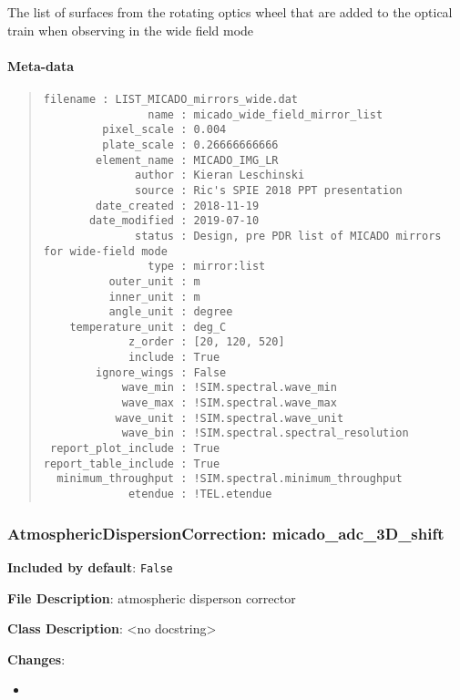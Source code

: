 The list of surfaces from the rotating optics wheel that are added to the optical train when observing in the wide field mode


\paragraph{Meta-data%
  \label{meta-data}%
}

\begin{quote}
\begin{alltt}
\begin{lstlisting}[frame=single]
            filename : LIST_MICADO_mirrors_wide.dat
                name : micado_wide_field_mirror_list
         pixel_scale : 0.004
         plate_scale : 0.26666666666
        element_name : MICADO_IMG_LR
              author : Kieran Leschinski
              source : Ric's SPIE 2018 PPT presentation
        date_created : 2018-11-19
       date_modified : 2019-07-10
              status : Design, pre PDR list of MICADO mirrors for wide-field mode
                type : mirror:list
          outer_unit : m
          inner_unit : m
          angle_unit : degree
    temperature_unit : deg_C
             z_order : [20, 120, 520]
             include : True
        ignore_wings : False
            wave_min : !SIM.spectral.wave_min
            wave_max : !SIM.spectral.wave_max
           wave_unit : !SIM.spectral.wave_unit
            wave_bin : !SIM.spectral.spectral_resolution
 report_plot_include : True
report_table_include : True
  minimum_throughput : !SIM.spectral.minimum_throughput
             etendue : !TEL.etendue
\end{lstlisting}
\end{alltt}
\end{quote}


\subsubsection{AtmosphericDispersionCorrection: \textquotedbl{}micado\_adc\_3D\_shift\textquotedbl{}%
  \label{atmosphericdispersioncorrection-micado-adc-3d-shift}%
}

\textbf{Included by default}: \texttt{False}

\textbf{File Description}: atmospheric disperson corrector

\textbf{Class Description}: <no docstring>

\textbf{Changes}:

\begin{itemize}
\item \end{itemize}


